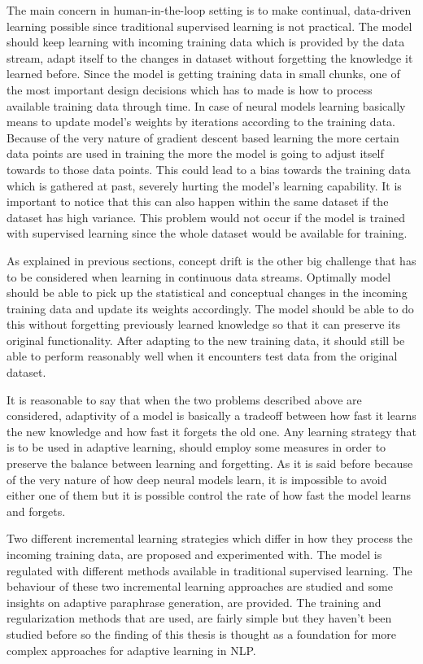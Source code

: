 The main concern in human-in-the-loop setting is to make continual, data-driven learning possible since traditional supervised learning is not practical. The model should keep learning with incoming training data which is provided by the data stream, adapt itself to the changes in dataset without forgetting the knowledge it learned before. Since the model is getting training data in small chunks, one of the most important design decisions which has to made is how to process available training data through time. In case of neural models learning basically means to update model's weights by iterations according to the training data. Because of the very nature of gradient descent based learning the more certain data points are used in training the more the model is going to adjust itself towards to those data points. This could lead to a bias towards the training data which is gathered at past, severely hurting the model's learning capability. It is important to notice that this can also happen within the same dataset if the dataset has high variance. This problem would not occur if the model is trained with supervised learning since the whole dataset would be available for training.

As explained in previous sections, concept drift is the other big challenge that has to be considered when learning in continuous data streams. Optimally model should be able to pick up the statistical and conceptual changes in the incoming training data and update its weights accordingly. The model should be able to do this without forgetting previously learned knowledge so that it can preserve its original functionality. After adapting to the new training data, it should still be able to perform reasonably well when it encounters test data from the original dataset. 

It is reasonable to say that when the two problems described above are considered, adaptivity of a model is basically a tradeoff between how fast it learns the new knowledge and how fast it forgets the old one. Any learning strategy that is to be used in adaptive learning, should employ some measures in order to preserve the balance between learning and forgetting. As it is said before because of the very nature of how deep neural models learn, it is impossible to avoid either one of them but it is possible control the rate of how fast the model learns and forgets.

Two different incremental learning strategies which differ in how they process the incoming training data, are proposed and experimented with. The model is regulated with different methods available in traditional supervised learning. The behaviour of these two incremental learning approaches are studied and some insights on adaptive paraphrase generation, are provided. The training and regularization methods that are used, are fairly simple but they haven't been studied before so the finding of this thesis is thought as a foundation for more complex approaches for adaptive learning in NLP.

